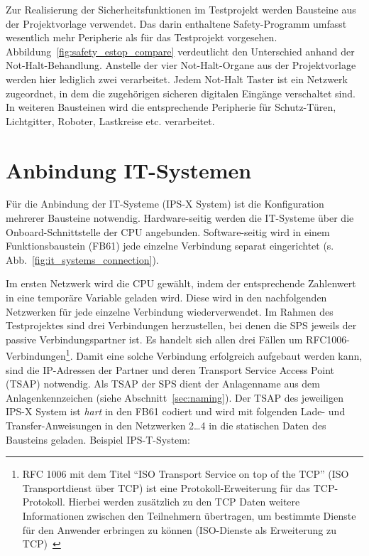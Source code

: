 Zur Realisierung der Sicherheitsfunktionen im Testprojekt werden Bausteine aus der Projektvorlage verwendet. Das darin enthaltene Safety-Programm umfasst wesentlich mehr Peripherie als für das Testprojekt vorgesehen. Abbildung~\ref{fig:safety_estop_compare} verdeutlicht den Unterschied anhand der Not-Halt-Behandlung. Anstelle der vier Not-Halt-Organe aus der Projektvorlage werden hier lediglich zwei verarbeitet. Jedem Not-Halt Taster ist ein Netzwerk zugeordnet, in dem die zugehörigen sicheren digitalen Eingänge verschaltet sind. In weiteren Bausteinen wird die entsprechende Peripherie für Schutz-Türen, Lichtgitter, Roboter, Lastkreise etc. verarbeitet.  




\section{Anbindung IT-Systemen}

Für die Anbindung der IT-Systeme (IPS-X System) ist die Konfiguration mehrerer Bausteine notwendig. Hardware-seitig werden die IT-Systeme über die Onboard-Schnittstelle der CPU angebunden. Software-seitig wird in einem Funktionsbaustein (FB61) jede einzelne Verbindung separat eingerichtet (s. Abb.~\ref{fig:it_systems_connection}).\par
Im ersten Netzwerk wird die CPU gewählt, indem der entsprechende Zahlenwert in eine temporäre Variable geladen wird. Diese wird in den nachfolgenden Netzwerken für jede einzelne Verbindung wiederverwendet. Im Rahmen des Testprojektes sind drei Verbindungen herzustellen, bei denen die SPS jeweils der passive Verbindungspartner ist. Es handelt sich allen drei Fällen um RFC1006-Verbindungen\footnote{RFC 1006 mit dem Titel ``ISO Transport Service on top of the TCP'' (ISO Transportdienst über TCP) ist eine Protokoll-Erweiterung für das TCP-Protokoll. Hierbei werden zusätzlich zu den TCP Daten weitere Informationen zwischen den Teilnehmern übertragen, um bestimmte Dienste für den Anwender erbringen zu können (ISO-Dienste als Erweiterung zu TCP)~}.
Damit eine solche Verbindung erfolgreich aufgebaut werden kann, sind die IP-Adressen der Partner und deren Transport Service Access Point (TSAP) notwendig. Als TSAP der SPS dient der Anlagenname aus dem Anlagenkennzeichen (siehe Abschnitt~\ref{sec:naming}). Der TSAP des jeweiligen IPS-X System ist \emph{hart} in den FB61 codiert und wird mit folgenden Lade- und Transfer-Anweisungen in den Netzwerken 2\ldots4 in die statischen Daten des Bausteins geladen. Beispiel IPS-T-System:\leer


